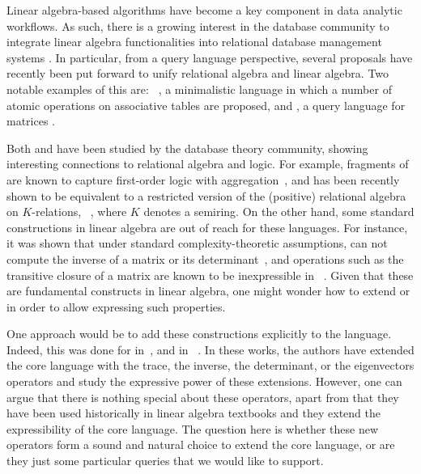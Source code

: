 

Linear algebra-based algorithms have become a key component in data analytic workflows. As such, there is a growing interest in the database community to integrate linear algebra functionalities into relational database management systems \cite{Jermaine/17/LAonRA,2019Boehm,LARA_Berlin_2016,JankovLYCZJG19,Khamis0NOS18}. In particular, from a query language perspective, several proposals have recently been put forward to unify relational algebra and linear algebra. Two notable examples of this are: \lara~\cite{HutchisonHS17}, a minimalistic language in which a number of atomic operations on 
associative tables are proposed, and \lang, a query language for 
matrices \cite{matlang,matlang-journal}.

Both \lara and \lang have been studied by the database theory community, showing interesting connections to relational algebra and logic. For example, fragments of \lara are known to capture first-order logic with aggregation~\cite{BarceloH0S20}, and \lang has been recently shown to be equivalent to a restricted version of the (positive) relational algebra on $K$-relations, \rak~\cite{brijder2019matrices}, where $K$ denotes a semiring. On the other hand, 
some standard constructions in linear algebra 
are out of reach for these languages. For instance, it was shown that under standard complexity-theoretic assumptions, \lara can not compute the inverse of a matrix or its determinant~\cite{BarceloH0S20}, and operations such as the transitive closure of a matrix are known to be inexpressible in \lang~\cite{matlang-journal}. Given that these are fundamental constructs in linear algebra, one might wonder how to extend \lara or \lang in order to allow expressing such properties.

One approach would be to add these constructions explicitly to the language. Indeed, this was done for \lang in~\cite{matlang-journal}, and \lara in ~\cite{BarceloH0S20}. In these works, the authors have extended the core language with the trace, the inverse, the determinant, or the eigenvectors operators and study the expressive power of these extensions. However, one can argue that there is nothing special about these operators, apart from that they have been used historically in linear algebra textbooks and they extend the expressibility of the core language. The question here is whether these new operators form a sound and natural choice to extend the core language, or are they just some particular queries that we would like to support. 

